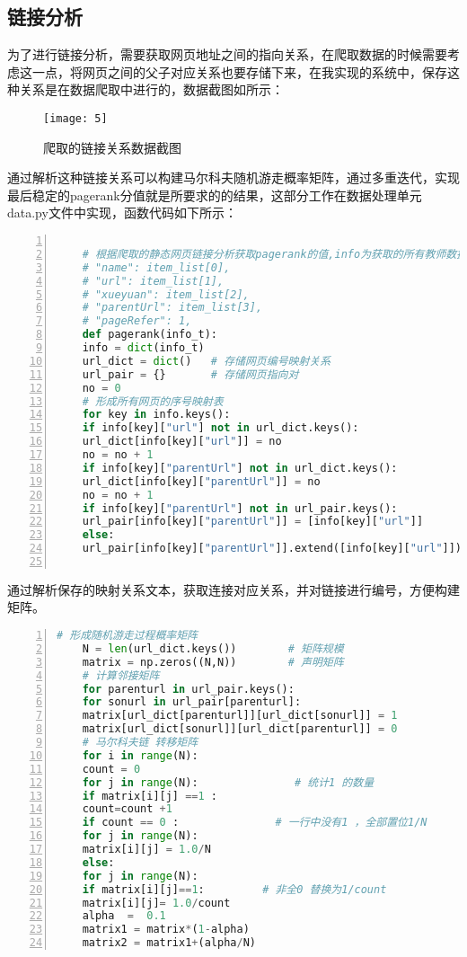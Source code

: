 \documentclass[lang=cn,11pt]{elegantpaper}
\begin{document}
\subsection{链接分析}

为了进行链接分析，需要获取网页地址之间的指向关系，在爬取数据的时候需要考虑这一点，将网页之间的父子对应关系也要存储下来，在我实现的系统中，保存这种关系是在数据爬取中进行的，数据截图如所示：

\begin{figure}[htbp]
	\centering
	\texttt{[image: 5]}
	\caption{爬取的链接关系数据截图 \label{fig:5}}
\end{figure}

通过解析这种链接关系可以构建马尔科夫随机游走概率矩阵，通过多重迭代，实现最后稳定的pagerank分值就是所要求的的结果，这部分工作在数据处理单元data.py文件中实现，函数代码如下所示：

\begin{lstlisting}[language = Python, numbers=left, 
numberstyle=\tiny,keywordstyle=\color{blue!70},
commentstyle=\color{red!50!green!50!blue!50},frame=shadowbox,
rulesepcolor=\color{red!20!green!20!blue!20},basicstyle=\ttfamily]
	
	# 根据爬取的静态网页链接分析获取pagerank的值,info为获取的所有教师数据，info字段如下
	# "name": item_list[0],
	# "url": item_list[1],
	# "xueyuan": item_list[2],
	# "parentUrl": item_list[3],
	# "pageRefer": 1,
	def pagerank(info_t):
	info = dict(info_t)
	url_dict = dict()   # 存储网页编号映射关系
	url_pair = {}       # 存储网页指向对
	no = 0
	# 形成所有网页的序号映射表
	for key in info.keys():
	if info[key]["url"] not in url_dict.keys():
	url_dict[info[key]["url"]] = no
	no = no + 1
	if info[key]["parentUrl"] not in url_dict.keys():
	url_dict[info[key]["parentUrl"]] = no
	no = no + 1
	if info[key]["parentUrl"] not in url_pair.keys():
	url_pair[info[key]["parentUrl"]] = [info[key]["url"]]
	else:
	url_pair[info[key]["parentUrl"]].extend([info[key]["url"]])
	
\end{lstlisting}

通过解析保存的映射关系文本，获取连接对应关系，并对链接进行编号，方便构建矩阵。

\begin{lstlisting}[language = Python, numbers=left, 
numberstyle=\tiny,keywordstyle=\color{blue!70},
commentstyle=\color{red!50!green!50!blue!50},frame=shadowbox,
rulesepcolor=\color{red!20!green!20!blue!20},basicstyle=\ttfamily]
	# 形成随机游走过程概率矩阵
	N = len(url_dict.keys())        # 矩阵规模
	matrix = np.zeros((N,N))        # 声明矩阵
	# 计算邻接矩阵
	for parenturl in url_pair.keys():
	for sonurl in url_pair[parenturl]:
	matrix[url_dict[parenturl]][url_dict[sonurl]] = 1
	matrix[url_dict[sonurl]][url_dict[parenturl]] = 0
	# 马尔科夫链 转移矩阵
	for i in range(N):
	count = 0
	for j in range(N):               # 统计1 的数量
	if matrix[i][j] ==1 :
	count=count +1
	if count == 0 :               # 一行中没有1 ，全部置位1/N
	for j in range(N):
	matrix[i][j] = 1.0/N
	else:
	for j in range(N):
	if matrix[i][j]==1:         # 非全0 替换为1/count
	matrix[i][j]= 1.0/count
	alpha  =  0.1
	matrix1 = matrix*(1-alpha)
	matrix2 = matrix1+(alpha/N)
\end{lstlisting}
\end{document}
